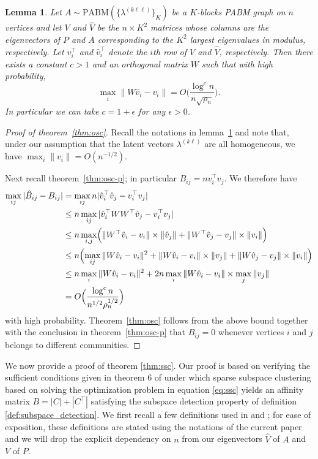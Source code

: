 \documentclass[
  12pt,
]{article}
\newtheorem{lemma}{Lemma}[section]
\theoremstyle{definition}
\theoremstyle{definition}
\theoremstyle{definition}
\theoremstyle{definition}
\theoremstyle{remark}
\begin{document}
\begin{lemma}
\label{lem:technical}
Let $A \sim \mathrm{PABM}(\{\lambda^{(k \ell \ell)}\}_{K})$ be a $K$-blocks
PABM graph on $n$ vertices and let \(V\) and \(\hat{V}\)
be the $n \times K^2$ matrices whose columns are the eigenvectors of 
\(P\) and \(A\) corresponding to the
$K^2$ largest eigenvalues in modulus, respectively.
Let \(v_i^\top\) and \(\hat{v}_i^\top\) denote the $i$th 
row of \(V\) and \(\hat{V}\), respectively. 
Then there exists a constant $c > 1$ and an orthogonal matrix $W$ such
that with high probability,
$$\max_{i} \|W \hat{v}_i - v_i\|  = O\Big(\frac{\log^{c}n}{n \sqrt{\rho_n}} \Big).$$
In particular we can take $c = 1 + \epsilon$ for any $\epsilon > 0$. 
\end{lemma}

\begin{proof}[Proof of theorem~\ref{thm:osc}]
Recall the notations in lemma~\ref{lem:technical} and note that,
under our assumption that the latent vectors $\lambda^{(k \ell)}$
are all homogeneous, we have $\max_{i} \|v_i\| =
O(n^{-1/2})$. 

Next recall theorem~\ref{thm:osc-p}; in particular $B_{ij} = nv_i^{\top}
v_j$. 
We therefore have
\[\begin{split}
\max_{ij} |\hat{B}_{ij} - B_{ij}| &= \max_{ij} n |\hat{v}_i^\top \hat{v}_j -
v_i^\top v_j| \\
& \leq n \max_{ij} |\hat{v}_i^\top W W^\top \hat{v}_j -
v_i^\top v_j| \\
& \leq n \max_{i,j} \Bigl(\|W^{\top} \hat{v}_i - v_i\| \times \|\hat{v}_j\|
+ \|W^{\top} \hat{v}_j - v_j\| \times \|v_i\|\Bigr) \\
& \leq n \Bigl(\max_{ij}  \|W \hat{v}_i  - v_i \|^2 +  \|W
\hat{v}_i  - v_i \| \times \|v_j\| +  \|W \hat{v}_j  - v_j \| \times \|v_i\|\Bigr) 
\\ &
\leq n \max_{i} \|W \hat{v}_i  - v_i \|^2 + 2n \max_{i}
\|W \hat{v}_i  - v_i \| \times \max_{j} \|v_j\|
\\
& = O \Big( \frac{\log^{c}{n}}{n^{1/2} \rho_n^{1/2}} \Big)
\end{split}\]
with high probability.
Theorem~\ref{thm:osc} follows from the above bound together with the
conclusion in theorem~\ref{thm:osc-p} that $B_{ij} = 0$ whenever vertices $i$ and $j$
belongs to different communities. 
\end{proof}

We now provide a proof of theorem \ref{thm:ssc}. Our proof is based on verifying the sufficient conditions given in theorem 6 of \citet{jmlr-v28-wang13} under which sparse subspace clustering based on solving the optimization problem in equation \eqref{eq:ssc} yields an affinity matrix \(B = |C| + |C^{\top}|\) satisfying the subspace detection property of definition \ref{def:subspace_detection}.
We first recall a few definitions used in \citet{soltanolkotabi2012} and \citet{jmlr-v28-wang13};
for ease of exposition, these definitions are stated using the notations of the current paper and we will drop the explicit dependency on \(n\) from our eigenvectors \(\hat{V}\) of \(A\) and \(V\) of \(P\).
\end{document}
